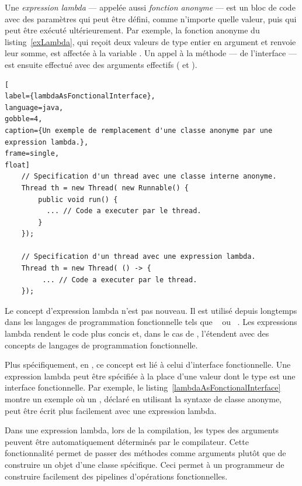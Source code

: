 Une \emph{expression lambda} ---  appel\'ee aussi \emph{fonction anonyme} --- est un bloc de code avec des param\`etres qui peut \^etre d\'efini, comme n'importe quelle valeur, puis qui peut \^etre ex\'ecut\'e ult\'erieurement. Par exemple, la fonction anonyme du listing~\ref{exLambda}, qui re\c{c}oit deux valeurs de type entier en argument et renvoie leur somme, est affect\'ee \`a la variable . Un appel \`a la m\'ethode  --- de l'interface  --- est ensuite effectu\'e avec des arguments effectifs ( et ).


\begin{lstlisting}[
label={lambdaAsFonctionalInterface},
language=java,
gobble=4,
caption={Un exemple de remplacement d'une classe anonyme par une expression lambda.},
frame=single,
float]
    // Specification d'un thread avec une classe interne anonyme.
	Thread th = new Thread( new Runnable() {
		public void run() {
          ... // Code a executer par le thread.
		}
	});

    // Specification d'un thread avec une expression lambda.
	Thread th = new Thread( () -> {
         ... // Code a executer par le thread.
	});
\end{lstlisting}



Le concept d'expression lambda n'est pas nouveau. Il est utilis\'e depuis longtemps dans les langages de programmation fonctionnelle tels que ~\citep{Steele84} ou ~\citep{HudakWad90,hutton2016programming}.
%
Les expressions lambda rendent le code plus concis et, dans le cas de , l'\'etendent avec des concepts de langages de programmation fonctionnelle. 

Plus sp\'ecifiquement, en , ce concept est li\'e \`a celui d'interface fonctionnelle. Une expression lambda peut \^etre sp\'ecifi\'ee \`a la place d'une valeur dont le type est une interface fonctionnelle. Par exemple, le listing~\ref{lambdaAsFonctionalInterface} montre un exemple o\`u un , d\'eclar\'e en utilisant la syntaxe de classe anonyme, peut \^etre \'ecrit plus facilement avec une expression lambda.

Dans une expression lambda, lors de la compilation, les types des arguments peuvent \^etre automatiquement d\'etermin\'es par le compilateur. Cette fonctionnalit\'e permet de passer des m\'ethodes comme arguments plut\^ot que de construire un objet d'une classe sp\'ecifique. Ceci permet \`a un programmeur de construire facilement des pipelines d'op\'erations fonctionnelles.


